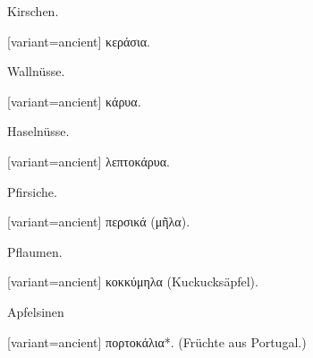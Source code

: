 Kirschen. 

\egroup\switchcolumn\bgroup

\begin{greek}[variant=ancient]%
κεράσια.

\end{greek}%
\egroup\switchcolumn*\bgroup

Wallnüsse. 

\egroup\switchcolumn\bgroup

\begin{greek}[variant=ancient]%
κάρυα.

\end{greek}%
\egroup\switchcolumn*\bgroup

Haselnüsse. 

\egroup\switchcolumn\bgroup

\begin{greek}[variant=ancient]%
λεπτοκάρυα.

\end{greek}%
\egroup\switchcolumn*\bgroup

Pfirsiche. 

\egroup\switchcolumn\bgroup

\begin{greek}[variant=ancient]%
περσικά (μῆλα).

\end{greek}%
\egroup\switchcolumn*\bgroup

Pflaumen. 

\egroup\switchcolumn\bgroup

\begin{greek}[variant=ancient]%
κοκκύμηλα (\textgerman[spelling=old,babelshorthands=true]{Kuckucks\textcompwordmark{}äpfel}).

\end{greek}%
\egroup\switchcolumn*\bgroup

Apfelsinen 

\egroup\switchcolumn\bgroup

\begin{greek}[variant=ancient]%
πορτοκάλια{*}. (\textgerman[spelling=old,babelshorthands=true]{Früchte
aus Portugal.})

\end{greek}%
\egroup\switchcolumn*\bgroup

